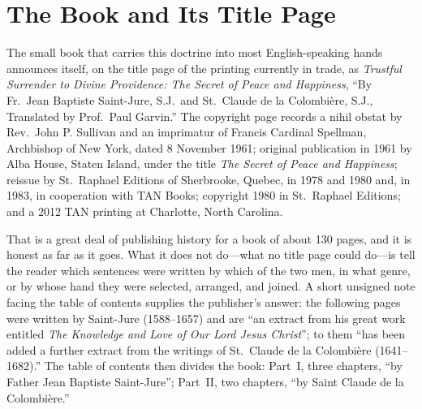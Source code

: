 \section{The Book and Its Title Page}

The small book that carries this doctrine into most English-speaking hands announces itself, on the title page of the printing currently in trade, as \emph{Trustful Surrender to Divine Providence: The Secret of Peace and Happiness}, ``By Fr.~Jean Baptiste Saint-Jure, S.J.\ and St.~Claude de la Colombière, S.J., Translated by Prof.~Paul Garvin.'' The copyright page records a nihil obstat by Rev.~John P. Sullivan and an imprimatur of Francis Cardinal Spellman, Archbishop of New York, dated 8 November 1961; original publication in 1961 by Alba House, Staten Island, under the title \emph{The Secret of Peace and Happiness}; reissue by St.~Raphael Editions of Sherbrooke, Quebec, in 1978 and 1980 and, in 1983, in cooperation with TAN Books; copyright 1980 in St.~Raphael Editions; and a 2012 TAN printing at Charlotte, North Carolina.

That is a great deal of publishing history for a book of about 130 pages, and it is honest as far as it goes. What it does not do---what no title page could do---is tell the reader which sentences were written by which of the two men, in what genre, or by whose hand they were selected, arranged, and joined. A short unsigned note facing the table of contents supplies the publisher's answer: the following pages were written by Saint-Jure (1588--1657) and are ``an extract from his great work entitled \emph{The Knowledge and Love of Our Lord Jesus Christ}''; to them ``has been added a further extract from the writings of St.~Claude de la Colombière (1641--1682).'' The table of contents then divides the book: Part~I, three chapters, ``by Father Jean Baptiste Saint-Jure''; Part~II, two chapters, ``by Saint Claude de la Colombière.''

